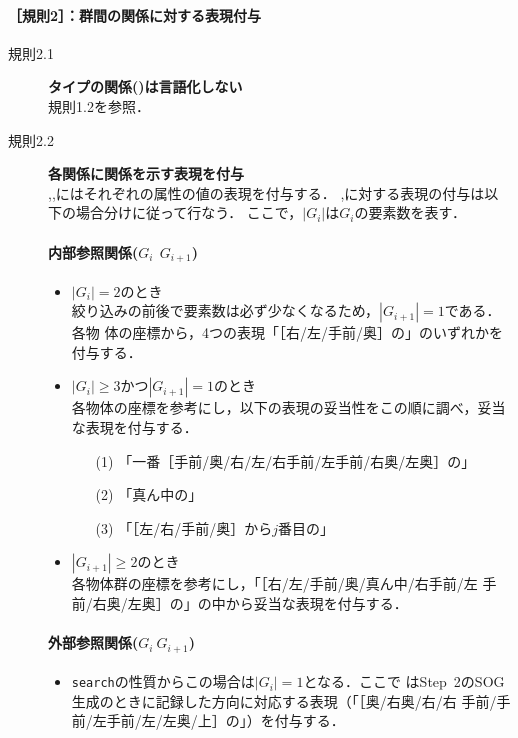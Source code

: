 \documentclass[japanese]{jnlp_1.2}
\def\rel#1{}
\def\mrel#1{}
\def\extrel{}
\def\mextrel{}
\begin{document}
\paragraph{［規則2］：群間の関係に対する表現付与}
\begin{description}
\item[規則2.1] \textbf{タイプの関係(\rel{type})は言語化しない}\\
  規則1.2を参照．
\item[規則2.2] \textbf{各関係に関係を示す表現を付与}\\
\rel{shape},\rel{color},\rel{size}にはそれぞれの属性の値の表現を付与する．
\extrel,\rel{space}に対する表現の付与は以下の場合分けに従って行なう．
ここで，$|G_i|$は$G_i$の要素数を表す．

\paragraph{内部参照関係($G_i\ \mrel{space}\ G_{i+1}$)}
\begin{itemize}
\item $|G_i|=2$のとき\\
  絞り込みの前後で要素数は必ず少なくなるため，$|G_{i+1}|=1$である．各物
  体の座標から，4つの表現「［右/左/手前/奥］の」のいずれかを付与する．
\item $|G_i|\geq 3$かつ$|G_{i+1}|=1$のとき\\
  各物体の座標を参考にし，以下の表現の妥当性をこの順に調べ，妥当な表現を付与する．
  \begin{itemize}
  \item[(1)]「一番［手前/奥/右/左/右手前/左手前/右奥/左奥］の」
  \item[(2)]「真ん中の」
  \item[(3)]「［左/右/手前/奥］から$j$番目の」
  \end{itemize}
\item $|G_{i+1}|\geq 2$のとき\\
  各物体群の座標を参考にし，「［右/左/手前/奥/真ん中/右手前/左
  手前/右奥/左奥］の」の中から妥当な表現を付与する．
\end{itemize}

\paragraph{外部参照関係($G_i \mextrel\ G_{i+1}$)}
\begin{itemize}
\item \texttt{search}の性質からこの場合は$|G_{i}|=1$となる．ここで
  はStep~2のSOG生成のときに記録した方向に対応する表現（「［奥/右奥/右/右
  手前/手前/左手前/左/左奥/上］の」）を付与する．
\end{itemize}
\end{description}
\end{document}
